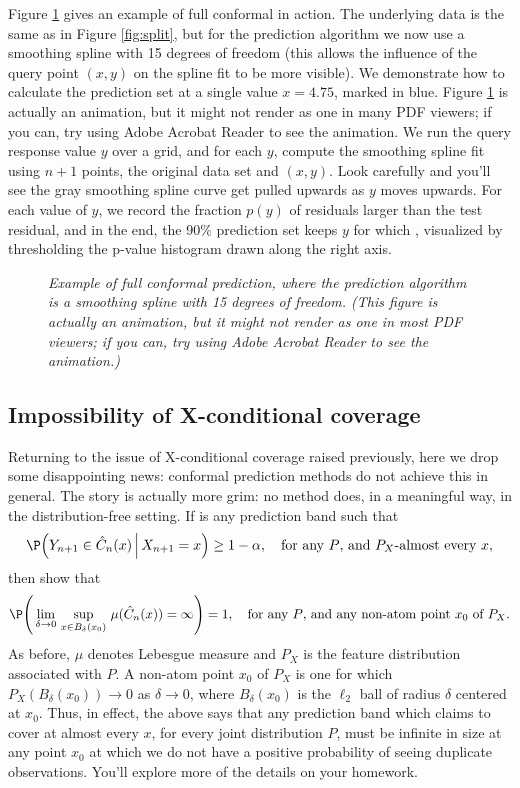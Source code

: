 \documentclass{article}
\begin{document}
Figure \ref{fig:full} gives an example of full conformal in action. The
underlying data is the same as in Figure \ref{fig:split}, but for the prediction
algorithm we now use a smoothing spline with 15 degrees of freedom (this allows
the influence of the query point $(x,y)$ on the spline fit to be more
visible). We demonstrate how to calculate the prediction set at a single value
$x=4.75$, marked in blue. Figure \ref{fig:full} is actually an animation, but it
might not render as one in many PDF viewers; if you can, try using Adobe Acrobat
Reader to see the animation. We run the query response value $y$ over a grid,
and for each $y$, compute the smoothing spline fit using $n+1$ points, the
original data set and $(x,y)$. Look carefully and you'll see the gray smoothing
spline curve get pulled upwards as $y$ moves upwards. For each value of $y$, we
record the fraction $p(y)$ of residuals larger than the test residual, and in
the end, the 90\% prediction set keeps $y$ for which , visualized by thresholding the p-value
histogram drawn along the right axis.  

\begin{figure}
\centering
{}
\caption{\it Example of full conformal prediction, where the prediction
  algorithm is a smoothing spline with 15 degrees of freedom. (This figure is
  actually an animation, but it might not render as one in most PDF viewers; if 
  you can, try using Adobe Acrobat Reader to see the animation.)}     
\label{fig:full}
\end{figure}

\subsection{Impossibility of X-conditional coverage}
\label{sec:impossibility}

Returning to the issue of X-conditional coverage raised previously, here we drop
some disappointing news: conformal prediction methods do not achieve this in
general. The story is actually more grim: no method does, in a meaningful
way, in the distribution-free setting. If  is any prediction band
such that  
\[
\P\Big( Y_{n+1} \in \hC_n(x) \, \Big| \, X_{n+1} = x \Big) \geq 1-\alpha, \quad 
\text{for any $P$, and $P_X$-almost every $x$},
\]
then \citet{lei2014distribution} show that  
\[
\P\Bigg( \lim_{\delta \to 0} \, \sup_{x \in B_\delta(x_0)} \, 
\mu(\hC_n(x)) = \infty \Bigg) = 1, \quad 
\text{for any $P$, and any non-atom point $x_0$ of $P_X$}. 
\]
As before, $\mu$ denotes Lebesgue measure and $P_X$ is the feature distribution
associated with $P$. A non-atom point $x_0$ of $P_X$ is one for which
$P_X(B_\delta(x_0)) \to 0$ as $\delta \to 0$, where $B_\delta(x_0)$ is the
$\ell_2$ ball of radius $\delta$ centered at $x_0$. Thus, in effect, the above
says that any prediction band which claims to cover at almost every $x$, for
every joint distribution $P$, must be infinite in size at any point $x_0$ at
which we do not have a positive probability of seeing duplicate observations. 
You'll explore more of the details on your homework.  
\end{document}
